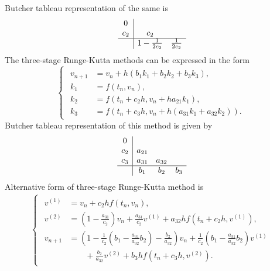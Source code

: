 \documentclass[a4paper, preprint,11pt]{elsarticle}
\numberwithin{equation}{section}
\begin{document}
Butcher tableau representation of the same is 
\begin{equation*}
  \begin{array}{c|cc}
    0 & \\
    c_2 & c_2 \\
    \hline
      & 1 - \frac{1}{2c_2} & \frac{1}{2c_2} \\
  \end{array}
\end{equation*}
 The three-stage Runge-Kutta methods can be expressed in the form
\begin{equation}    \label{eq:crk_3}
\begin{cases}
\begin{aligned}
v_{n+1} &= v_n + h(b_1 k_1 + b_2 k_2 + b_3 k_3), \\
k_1 &= f(t_n, v_n), \\
k_2 &= f(t_n + c_2 h, v_n + h a_{21} k_1), \\
k_3 &= f(t_n + c_3 h, v_n + h(a_{31} k_1 + a_{32} k_2)).
\end{aligned}
\end{cases}
\end{equation}
Butcher tableau representation of this method is given by 
\[
  \begin{array}{c|ccc}
    0 & \\
    c_2 & a_{21} \\
    c_3 & a_{31} & a_{32} \\
    \hline
      & b_1 & b_2 & b_3 \\
  \end{array}
\]
Alternative form of three-stage Runge-Kutta method is
\begin{eqnarray*}
\begin{cases}
\begin{aligned}
  v^{(1)} &= v_n + c_2 h f(t_n, v_n), \\
    v^{(2)} &= \left(1 - \frac{a_{31}}{c_2}\right)v_n + \frac{a_{31}}{c_2}v^{(1)} + a_{32} h f\left(t_n + c_2 h, v^{(1)}\right), \\
    v_{n+1} &= \left(1 - \frac{1}{c_2}\left(b_1 - \frac{a_{31}}{a_{32}}b_2\right) - \frac{b_2}{a_{32}}\right)v_n + \frac{1}{c_2}\left(b_1 - \frac{a_{31}}{a_{32}}b_2\right)v^{(1)} \\
     & \qquad + \frac{b_2}{a_{32}}v^{(2)} + b_3 h f\left(t_n + c_3 h, v^{(2)}\right).    
\end{aligned}    
\end{cases} 
\end{eqnarray*}
\end{document}
